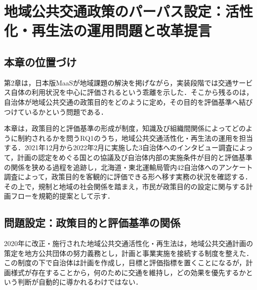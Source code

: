 
\chapter{地域公共交通政策のパーパス設定：活性化・再生法の運用問題と改革提言}
\label{chap:purpose_transport}

\section{本章の位置づけ}
\label{sec:ch5_position}

第2章は，日本版MaaSが地域課題の解決を掲げながら，実装段階では交通サービス自体の利用状況を中心に評価されるという乖離を示した．そこから残るのは，自治体が地域公共交通の政策目的をどのように定め，その目的を評価基準へ結びつけているかという問題である．

本章は，政策目的と評価基準の形成が制度，知識及び組織間関係によってどのように制約されるかを問うRQ1のうち，地域公共交通活性化・再生法の運用を担当する．2021年12月から2022年2月に実施した3自治体へのインタビュー調査によって，計画の認定をめぐる国との協議及び自治体内部の実施条件が目的と評価基準の関係を狭める過程を追跡し，北海道・東北運輸局管内42自治体へのアンケート調査によって，政策目的を客観的に評価できる形へ移す実務の状況を確認する．その上で，規制と地域の社会関係を踏まえ，市民が政策目的の設定に関与する計画フローを規範的提案として示す．

\section{問題設定：政策目的と評価基準の関係}
\label{sec:ch5_intro}

2020年に改正・施行された地域公共交通活性化・再生法は，地域公共交通計画の策定を地方公共団体の努力義務とし，計画と事業実施を接続する制度を整えた．この制度の下で自治体は計画を作成し，目標と評価指標を置くことになるが，計画様式が存在することから，何のために交通を維持し，どの効果を優先するかという判断が自動的に導かれるわけではない．

